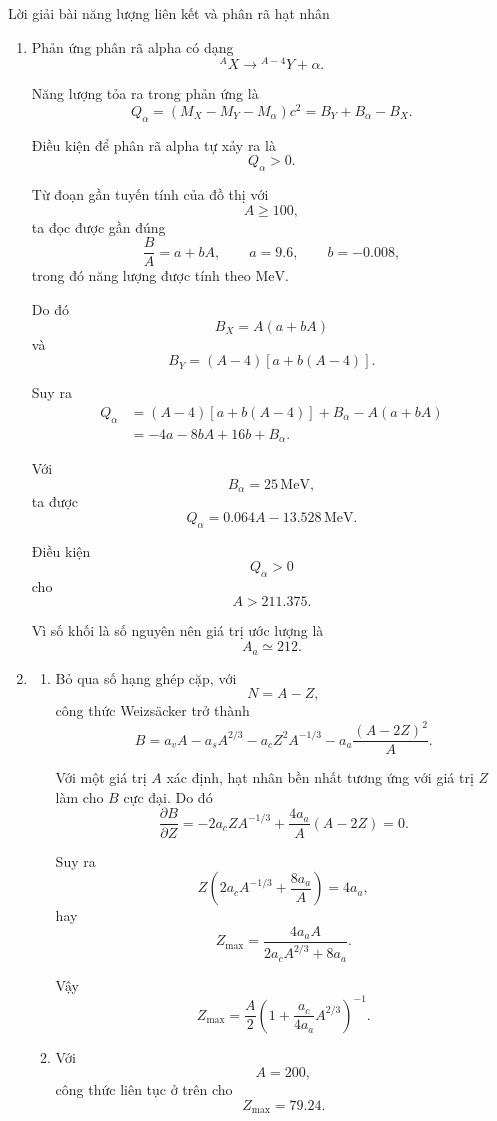 \documentclass[12pt,a4paper]{article}
\begin{document}
\begin{center}
Lời giải bài năng lượng liên kết và phân rã hạt nhân
\end{center}

\begin{enumerate}[leftmargin=*,itemsep=1em]

\item
Phản ứng phân rã alpha có dạng
$$
{}^{A}X\longrightarrow {}^{A-4}Y+\alpha.
$$

Năng lượng tỏa ra trong phản ứng là
$$
Q_\alpha
=\left(M_X-M_Y-M_\alpha\right)c^2
=B_Y+B_\alpha-B_X.
$$

Điều kiện để phân rã alpha tự xảy ra là
$$
Q_\alpha>0.
$$

Từ đoạn gần tuyến tính của đồ thị với
$$
A\geq 100,
$$
ta đọc được gần đúng
$$
\frac{B}{A}=a+bA,
\qquad
a=9.6,
\qquad
b=-0.008,
$$
trong đó năng lượng được tính theo $\mathrm{MeV}$.

Do đó
$$
B_X=A(a+bA)
$$
và
$$
B_Y=(A-4)\left[a+b(A-4)\right].
$$

Suy ra
$$
\begin{aligned}
Q_\alpha
&=(A-4)\left[a+b(A-4)\right]+B_\alpha-A(a+bA)\\
&=-4a-8bA+16b+B_\alpha.
\end{aligned}
$$

Với
$$
B_\alpha=25\,\mathrm{MeV},
$$
ta được
$$
Q_\alpha=0.064A-13.528\,\mathrm{MeV}.
$$

Điều kiện
$$
Q_\alpha>0
$$
cho
$$
A>211.375.
$$

Vì số khối là số nguyên nên giá trị ước lượng là
$$
A_a\simeq 212.
$$

\item
\begin{enumerate}[label=\alph*.,leftmargin=2em,itemsep=1em]

\item
Bỏ qua số hạng ghép cặp, với
$$
N=A-Z,
$$
công thức Weizs\"acker trở thành
$$
B=a_vA-a_sA^{2/3}-a_cZ^2A^{-1/3}
-a_a\frac{(A-2Z)^2}{A}.
$$

Với một giá trị $A$ xác định, hạt nhân bền nhất tương ứng với giá trị $Z$ làm
cho $B$ cực đại. Do đó
$$
\frac{\partial B}{\partial Z}
=-2a_cZA^{-1/3}
+\frac{4a_a}{A}(A-2Z)=0.
$$

Suy ra
$$
Z\left(2a_cA^{-1/3}+\frac{8a_a}{A}\right)=4a_a,
$$
hay
$$
Z_{\max}
=\frac{4a_aA}{2a_cA^{2/3}+8a_a}.
$$

Vậy
$$
Z_{\max}
=\frac{A}{2}
\left(1+\frac{a_c}{4a_a}A^{2/3}\right)^{-1}.
$$

\item
Với
$$
A=200,
$$
công thức liên tục ở trên cho
$$
Z_{\max}=79.24.
$$


\end{enumerate}
\end{enumerate}
\end{document}
